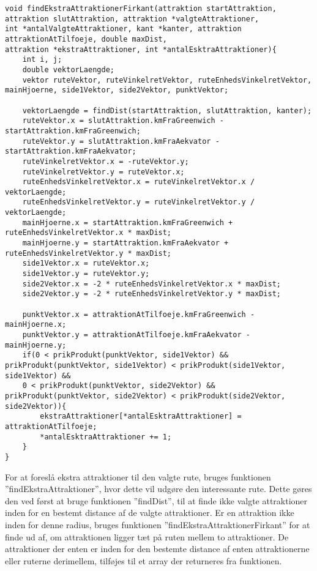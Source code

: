 \begin{lstlisting}
void findEkstraAttraktionerFirkant(attraktion startAttraktion, attraktion slutAttraktion, attraktion *valgteAttraktioner, 
int *antalValgteAttraktioner, kant *kanter, attraktion attraktionAtTilfoeje, double maxDist, 
attraktion *ekstraAttraktioner, int *antalEsktraAttraktioner){
	int i, j;
	double vektorLaengde;
	vektor ruteVektor, ruteVinkelretVektor, ruteEnhedsVinkelretVektor, mainHjoerne, side1Vektor, side2Vektor, punktVektor;
	
	vektorLaengde = findDist(startAttraktion, slutAttraktion, kanter);
	ruteVektor.x = slutAttraktion.kmFraGreenwich - startAttraktion.kmFraGreenwich;
	ruteVektor.y = slutAttraktion.kmFraAekvator - startAttraktion.kmFraAekvator;
	ruteVinkelretVektor.x = -ruteVektor.y;
	ruteVinkelretVektor.y = ruteVektor.x;
	ruteEnhedsVinkelretVektor.x = ruteVinkelretVektor.x / vektorLaengde;
	ruteEnhedsVinkelretVektor.y = ruteVinkelretVektor.y / vektorLaengde;
	mainHjoerne.x = startAttraktion.kmFraGreenwich + ruteEnhedsVinkelretVektor.x * maxDist;
	mainHjoerne.y = startAttraktion.kmFraAekvator + ruteEnhedsVinkelretVektor.y * maxDist;
	side1Vektor.x = ruteVektor.x;
	side1Vektor.y = ruteVektor.y;
	side2Vektor.x = -2 * ruteEnhedsVinkelretVektor.x * maxDist;
	side2Vektor.y = -2 * ruteEnhedsVinkelretVektor.y * maxDist;
	
	punktVektor.x = attraktionAtTilfoeje.kmFraGreenwich - mainHjoerne.x;
	punktVektor.y = attraktionAtTilfoeje.kmFraAekvator - mainHjoerne.y;
	if(0 < prikProdukt(punktVektor, side1Vektor) && prikProdukt(punktVektor, side1Vektor) < prikProdukt(side1Vektor, side1Vektor) &&
	0 < prikProdukt(punktVektor, side2Vektor) && prikProdukt(punktVektor, side2Vektor) < prikProdukt(side2Vektor, side2Vektor)){
		ekstraAttraktioner[*antalEsktraAttraktioner] = attraktionAtTilfoeje;
		*antalEsktraAttraktioner += 1;
	}
}
\end{lstlisting}

For at foreslå ekstra attraktioner til den valgte rute, bruges funktionen ”findEkstraAttraktioner”, hvor dette vil udgøre den interessante rute. Dette gøres den ved først at bruge funktionen ”findDist”, til at finde ikke valgte attraktioner inden for en bestemt distance af de valgte attraktioner. Er en attraktion ikke inden for denne radius, bruges funktionen ”findEkstraAttraktionerFirkant” for at finde ud af, om attraktionen ligger tæt på ruten mellem to attraktioner. De attraktioner der enten er inden for den bestemte distance af enten attraktionerne eller ruterne derimellem, tilføjes til et array der returneres fra funktionen. \newline

